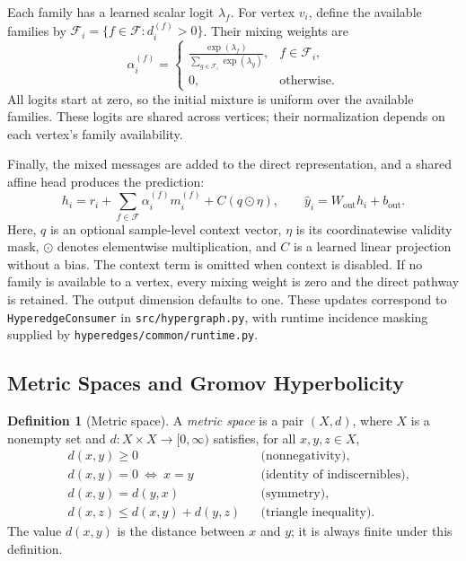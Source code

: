 \documentclass{article}
\theoremstyle{definition}
\newtheorem{definition}{Definition}
\theoremstyle{plain}
\begin{document}
Each family has a learned scalar logit $\lambda_f$. For vertex $v_i$,
define the available families by
$\mathcal{F}_i=\{f\in\mathcal{F}:d_i^{(f)}>0\}$. Their mixing weights are
\[
  \alpha_i^{(f)}=
  \begin{cases}
    \displaystyle\frac{\exp(\lambda_f)}
      {\sum_{g\in\mathcal{F}_i}\exp(\lambda_g)},
      & f\in\mathcal{F}_i,\\[6pt]
    0, & \text{otherwise}.
  \end{cases}
\]
All logits start at zero, so the initial mixture is uniform over the
available families. These logits are shared across vertices; their
normalization depends on each vertex's family availability.

Finally, the mixed messages are added to the direct representation,
and a shared affine head produces the prediction:
\[
  h_i=r_i+\sum_{f\in\mathcal{F}}\alpha_i^{(f)}m_i^{(f)}
      +C(q\odot\eta),\qquad
  \widehat y_i=W_{\mathrm{out}}h_i+b_{\mathrm{out}}.
\]
Here, $q$ is an optional sample-level context vector, $\eta$ is its
coordinatewise validity mask, $\odot$ denotes elementwise multiplication,
and $C$ is a learned linear projection without a bias. The context term
is omitted when context is disabled. If no family is available to a
vertex, every mixing weight is zero and the direct pathway is retained.
The output dimension defaults to one. These updates correspond to
\texttt{HyperedgeConsumer} in \texttt{src/hypergraph.py}, with runtime
incidence masking supplied by \texttt{hyperedges/common/runtime.py}.

\subsection{Metric Spaces and Gromov Hyperbolicity}

\begin{definition}[Metric space]
\label{def:metric-space}
A \emph{metric space} is a pair $(X,d)$, where $X$ is a nonempty set
and $d:X\times X\to[0,\infty)$ satisfies, for all $x,y,z\in X$,
\[
  \begin{aligned}
    &d(x,y)\geq0
      &&\text{(nonnegativity)},\\
    &d(x,y)=0\ \Longleftrightarrow\ x=y
      &&\text{(identity of indiscernibles)},\\
    &d(x,y)=d(y,x)
      &&\text{(symmetry)},\\
    &d(x,z)\leq d(x,y)+d(y,z)
      &&\text{(triangle inequality)}.
  \end{aligned}
\]
The value $d(x,y)$ is the distance between $x$ and $y$; it is always
finite under this definition.
\end{definition}
\end{document}
